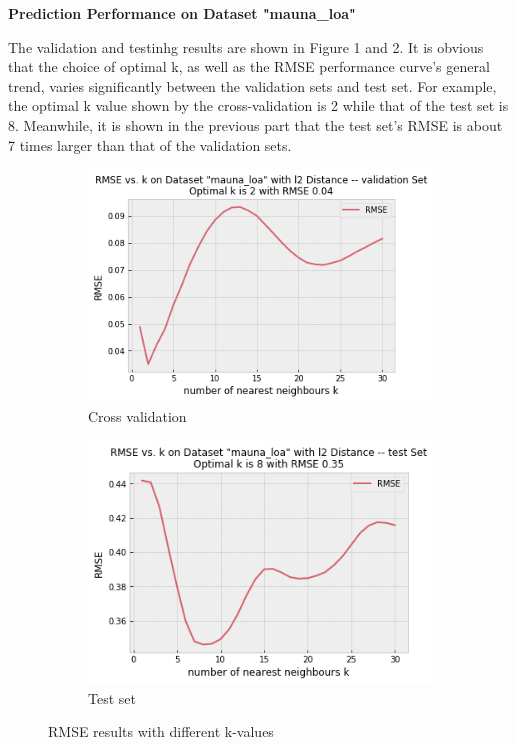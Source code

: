 \documentclass{article} %
\begin{document}
\vspace{0.2cm}

\textbf{Prediction Performance on Dataset "mauna\_loa"}

  The validation and testinhg results are shown in Figure 1 and 2. It is obvious that the choice of optimal k, as well as the RMSE performance curve's general trend, varies significantly between the validation sets and test set. For example, the optimal k value shown by the cross-validation is 2 while that of the test set is 8. Meanwhile, it is shown in the previous part that the test set's RMSE is about 7 times larger than that of the validation sets.

    \begin{figure}[!b]
      \centering
      \begin{subfigure}[b]{0.45\linewidth}
        \includegraphics[width=\linewidth]{output_12_0.png}
        \caption{Cross validation}
      \end{subfigure}
      \begin{subfigure}[b]{0.45\linewidth}
        \includegraphics[width=\linewidth]{output_12_2.png}
        \caption{Test set}
      \end{subfigure}
      \caption{RMSE results with different k-values}
      \label{fig:Q1_1}
    \end{figure}
\end{document}
